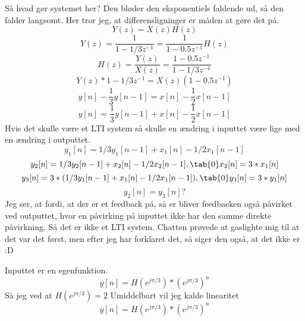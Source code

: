 \begin{Opgaver}
\begin{kapitel}
\begin{Opgave}
            \begin{UnderOpgave}[\text{$x[n] = (1/2)^nu[n] \rightarrow y[n] = (1/3)^nu[n]$}]
                Så hvad gør systemet her? Den bløder den eksponentiels faldende ud, så den falder langsomt. 
                Her tror jeg, at differensligninger er måden at gøre det på. 
                \[Y(z) = X(z)H(z)\]
                \[Y(z) = \frac{1}{1 - 1/3z^{-1}} = \frac{1}{1 - 0.5z^{-1}} H(z)\]
                \[H(z) = \frac{Y(z)}{X(z)} = \frac{1 - 0.5z^{-1}}{1 - 1/3z^{-1}}\]
                \[Y(z) * 1 - 1/3z^{-1} = X(z)(1 - 0.5z^{-1})\]
                \[y[n] - \frac{1}{3}y[n - 1] = x[n] - \frac{1}{2}x[n - 1]\]
                \[y[n] = \frac{1}{3}y[n - 1] + x[n] - \frac{1}{2}x[n - 1]\]
                Hvis det skulle være et LTI system så skulle en ændring i inputtet være lige med en ændring i outputtet. 
                \[y_1[n] = 1/3y_1[n - 1] + x_1[n] - 1/2x_1[n - 1]\] 
                \[y_2[n] = 1/3y_2[n - 1] + x_2[n] - 1/2x_2[n - 1], \tab{0} x_2[n] = 3*x_1[n]\] 
                \[y_3[n] = 3*(1/3y_1[n - 1] + x_1[n] - 1/2x_1[n - 1]), \tab{0} y_3[n] = 3*y_1[n]\] 
                \[y_2[n] = y_3[n] ? \]
                Jeg ser, at fordi, at der er et feedback på, så er bliver feedbacken også påvirket ved outputtet, hvor en påvirking på inputtet ikke har den samme direkte påvirkning. 
                Så det er ikke et LTI system. 
                Chatten prøvede at gaslighte mig til at det var det først, men efter jeg har forklaret det, så siger den også, at det ikke er :D
            \end{UnderOpgave}
            \begin{UnderOpgave}[\text{$x[n] = e^{j\pi n/3} \rightarrow y[n] = 2 * e^{j\pi n/3}$}]
                Inputtet er en egenfunktion. 
                \[y[n] = H(e^{j\pi/3})*(e^{j\pi/3})^n\]
                Så jeg ved at $H(e^{j\pi/3}) = 2$
                Umiddelbart vil jeg kalde linearitet
                \[y[n] = H(e^{j\pi/3})*(e^{j\pi/3})^n\]
                

\end{UnderOpgave}
\end{Opgave}
\end{kapitel}
\end{Opgaver}
